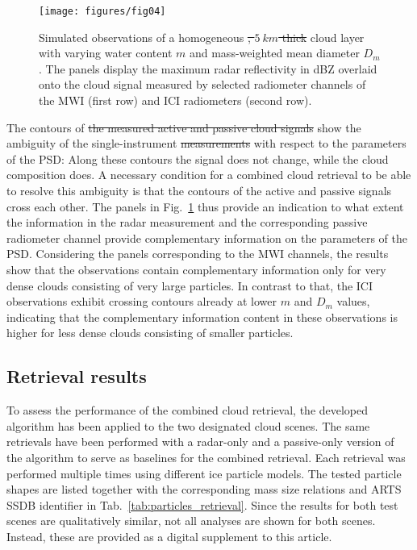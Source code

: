 \documentclass[journal abbreviation, manuscript]{copernicus}
\providecommand{\DIFadd}[1]{{\protect\color{blue}\uwave{#1}}} %
\providecommand{\DIFdel}[1]{{\protect\color{red}\sout{#1}}}                      %
\providecommand{\DIFaddbegin}{} %
\providecommand{\DIFaddend}{} %
\providecommand{\DIFdelbegin}{} %
\providecommand{\DIFdelend}{} %
\providecommand{\DIFaddFL}[1]{\DIFadd{#1}} %
\providecommand{\DIFdelFL}[1]{\DIFdel{#1}} %
\providecommand{\DIFaddbeginFL}{} %
\providecommand{\DIFaddendFL}{} %
\providecommand{\DIFdelbeginFL}{} %
\providecommand{\DIFdelendFL}{} %
\begin{document}
\begin{figure}
\centering
\texttt{[image: figures/fig04]}
\caption{Simulated observations of a homogeneous \DIFdelbeginFL \DIFdelFL{, $5\ \unit{km}$ thick }\DIFdelendFL cloud layer with varying water
  content $m$ and mass-weighted mean diameter $D_m$. The panels display the
  maximum radar reflectivity in dBZ \DIFaddbeginFL \DIFaddFL{($\text{dBZ}_\text{max}$) }\DIFaddendFL overlaid onto the
  cloud signal \DIFaddbeginFL \DIFaddFL{($\Delta T_B$) }\DIFaddendFL measured by selected radiometer channels of the
  MWI (first row) and ICI radiometers (second row).}
\label{fig:contours}
\end{figure}

The contours of \DIFdelbegin \DIFdel{the measured active and passive cloud signals }\DIFdelend \DIFaddbegin \DIFadd{$\Delta T_B$ and $\text{dBZ}_\text{max}$  }\DIFaddend show the ambiguity
of the single-instrument \DIFdelbegin \DIFdel{measurements }\DIFdelend \DIFaddbegin \DIFadd{observations }\DIFaddend with respect to the parameters of the PSD:
Along these contours the signal does not change, while the cloud composition
does. A necessary condition for a combined cloud retrieval to be able to resolve
this ambiguity is that the contours of the active and passive signals cross each
other. The panels in Fig.~\ref{fig:contours} thus provide an indication to what
extent the information in the radar measurement and the corresponding passive
radiometer channel provide complementary information on the parameters of the
PSD. Considering the panels corresponding to the MWI channels, the results show
that the observations contain complementary information only for very dense
clouds consisting of very large particles. In contrast to that, the ICI
observations exhibit crossing contours already at lower $m$ and $D_m$ values,
indicating that the complementary information content in these observations is
higher for less dense clouds consisting of smaller particles.

\subsection{Retrieval results}

To assess the performance of the combined cloud retrieval, the developed
algorithm has been applied to the two designated cloud scenes. The same
retrievals have been performed with a radar-only and a passive-only version of
the algorithm to serve as baselines for the combined retrieval. Each retrieval
was performed multiple times using different ice particle models. The tested
particle shapes are listed together with the corresponding mass size relations
and ARTS SSDB identifier in Tab.~\ref{tab:particles_retrieval}. Since the
results for both test scenes are qualitatively similar, not all analyses are
shown for both scenes. Instead, these are provided as a digital supplement to
this article.
\end{document}
